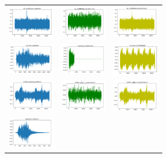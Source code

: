 \documentclass{article}
\begin{document}
\begin{figure}[!htb]
    \begin{tabular}{ccc}
        \includegraphics[width=2cm]{pic/AC_RW.png}
        &\includegraphics[width=2cm]{pic/AC_RSD.png}
        &\includegraphics[width=2cm]{pic/AC_RSRP.png}\\
        \includegraphics[width=2cm]{pic/CH_RW.png}
        &\includegraphics[width=2cm]{pic/CH_RSD.png}
        &\includegraphics[width=2cm]{pic/CH_RSP.png}\\
        \includegraphics[width=2cm]{pic/CP_RW.png}
        &\includegraphics[width=2cm]{pic/CP_RSD.png}
        &\includegraphics[width=2cm]{pic/CP_RSRP.png}\\
        \includegraphics[width=2cm]{pic/DB_RW.png}

\end{tabular}
\end{figure}
\end{document}
